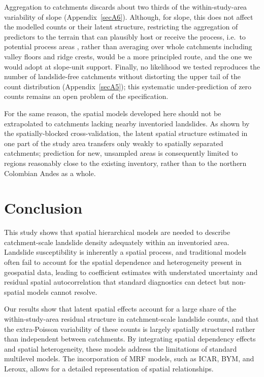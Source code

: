 \documentclass[journal abbreviation, manuscript]{copernicus}
\newcommand{\hl}[1]{#1}
\newcommand{\hlE}[1]{#1}
\begin{document}
\hlE{Aggregation to catchments discards about two thirds of the within-study-area variability of slope (\mbox{Appendix~\ref{secA6}}). Although, for slope, this does not affect the modelled counts or their latent structure, restricting the aggregation of predictors to the terrain that can plausibly host or receive the process, i.e.~to potential process areas }\citep{steger2026dynamic}\hlE{, rather than averaging over whole catchments including valley floors and ridge crests, would be a more principled route, and the one we would adopt at slope-unit support. Finally, no likelihood we tested reproduces the number of landslide-free catchments without distorting the upper tail of the count distribution (\mbox{Appendix~\ref{secA5}}); this systematic under-prediction of zero counts remains an open problem of the specification.}

\hl{For the same reason, the spatial models developed here should not be extrapolated to catchments lacking nearby inventoried landslides. 
As shown by the spatially-blocked cross-validation,} \hlE{the latent spatial structure estimated in one part of the study area transfers only weakly to spatially separated catchments;} \hl{prediction for new, unsampled areas is consequently limited to regions reasonably close to the existing inventory, rather than to the northern Colombian Andes as a whole.}

\section{Conclusion}\label{sec6}

\hlE{This study shows that spatial hierarchical models are needed to describe catchment-scale landslide density adequately within an inventoried area.} 
Landslide susceptibility is inherently a spatial process, and traditional models often fail to account for the spatial dependence and heterogeneity present in geospatial data, \hl{leading to} \hlE{coefficient estimates with understated uncertainty} \hl{and residual spatial autocorrelation that standard diagnostics can detect but non-spatial models cannot resolve.}

\hlE{Our results show that latent spatial effects account for a large share of the within-study-area residual structure in catchment-scale landslide counts, and that the extra-Poisson variability of these counts is largely spatially structured rather than independent between catchments.} 
By integrating spatial dependency effects and spatial heterogeneity, these models address the limitations of standard multilevel models. 
The incorporation of MRF models, such as ICAR, BYM, and Leroux, allows for a detailed representation of spatial relationships.
\end{document}
